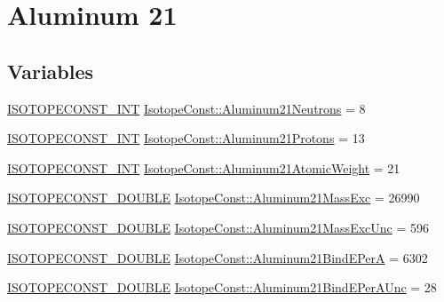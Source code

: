 \hypertarget{group___isotope_const-_aluminum-_al21}{}\section{Aluminum 21}
\label{group___isotope_const-_aluminum-_al21}
\subsection*{Variables}
\begin{DoxyCompactItemize}
\item 
\mbox{\hyperlink{group___isotope_const-_macros_ga5f18360b3e99483a35c32d789e62621c}{I\+S\+O\+T\+O\+P\+E\+C\+O\+N\+S\+T\+\_\+\+I\+NT}} \mbox{\hyperlink{group___isotope_const-_aluminum-_al21_gaba503b7b63a02edcc787d2d304d92e2a}{Isotope\+Const\+::\+Aluminum21\+Neutrons}} = 8
\item 
\mbox{\hyperlink{group___isotope_const-_macros_ga5f18360b3e99483a35c32d789e62621c}{I\+S\+O\+T\+O\+P\+E\+C\+O\+N\+S\+T\+\_\+\+I\+NT}} \mbox{\hyperlink{group___isotope_const-_aluminum-_al21_gaaa551cf92d2d9ed6d1709d11570e401c}{Isotope\+Const\+::\+Aluminum21\+Protons}} = 13
\item 
\mbox{\hyperlink{group___isotope_const-_macros_ga5f18360b3e99483a35c32d789e62621c}{I\+S\+O\+T\+O\+P\+E\+C\+O\+N\+S\+T\+\_\+\+I\+NT}} \mbox{\hyperlink{group___isotope_const-_aluminum-_al21_ga929f867586a04e72e4eb4ae2742b1f2c}{Isotope\+Const\+::\+Aluminum21\+Atomic\+Weight}} = 21
\item 
\mbox{\hyperlink{group___isotope_const-_macros_ga8f45a7272ce02c0b4c65c44636ed719a}{I\+S\+O\+T\+O\+P\+E\+C\+O\+N\+S\+T\+\_\+\+D\+O\+U\+B\+LE}} \mbox{\hyperlink{group___isotope_const-_aluminum-_al21_ga62a4da80db275044bea6860d6102933c}{Isotope\+Const\+::\+Aluminum21\+Mass\+Exc}} = 26990
\item 
\mbox{\hyperlink{group___isotope_const-_macros_ga8f45a7272ce02c0b4c65c44636ed719a}{I\+S\+O\+T\+O\+P\+E\+C\+O\+N\+S\+T\+\_\+\+D\+O\+U\+B\+LE}} \mbox{\hyperlink{group___isotope_const-_aluminum-_al21_gac235aa794eff0be1cadc99ac32c505ea}{Isotope\+Const\+::\+Aluminum21\+Mass\+Exc\+Unc}} = 596
\item 
\mbox{\hyperlink{group___isotope_const-_macros_ga8f45a7272ce02c0b4c65c44636ed719a}{I\+S\+O\+T\+O\+P\+E\+C\+O\+N\+S\+T\+\_\+\+D\+O\+U\+B\+LE}} \mbox{\hyperlink{group___isotope_const-_aluminum-_al21_gabbaa49da3ad51dbfcd8b07d1d32f43d6}{Isotope\+Const\+::\+Aluminum21\+Bind\+E\+PerA}} = 6302
\item 
\mbox{\hyperlink{group___isotope_const-_macros_ga8f45a7272ce02c0b4c65c44636ed719a}{I\+S\+O\+T\+O\+P\+E\+C\+O\+N\+S\+T\+\_\+\+D\+O\+U\+B\+LE}} \mbox{\hyperlink{group___isotope_const-_aluminum-_al21_gadd2a625896fecdc24a2acd645383a5ce}{Isotope\+Const\+::\+Aluminum21\+Bind\+E\+Per\+A\+Unc}} = 28

\end{DoxyCompactItemize}
